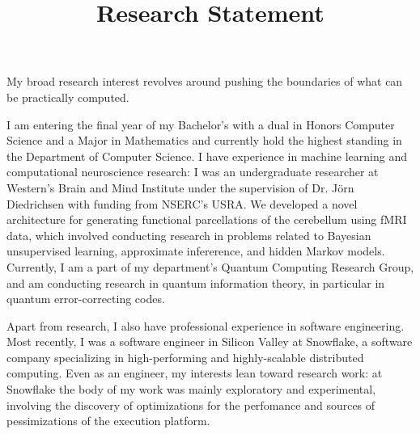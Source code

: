 \documentclass[11pt,a4paper,sans]{moderncv} %
\title{Research Statement}
\begin{document}
\makecvtitle %


\setlength{\parskip}{12pt}


My broad research interest revolves around pushing the boundaries of what can be practically computed.

I am entering the final year of my Bachelor's with a dual in Honors Computer Science and a Major in Mathematics and currently hold the highest standing in the Department of Computer Science. I have experience in machine learning and computational neuroscience research: I was an undergraduate researcher at Western's Brain and Mind Institute under the supervision of Dr. Jörn Diedrichsen with funding from NSERC's USRA. We developed a novel architecture for generating functional parcellations of the cerebellum using fMRI data, which involved conducting research in problems related to Bayesian unsupervised learning, approximate infererence, and hidden Markov models. Currently, I am a part of my department's Quantum Computing Research Group, and am conducting research in quantum information theory, in particular in quantum error-correcting codes.

Apart from research, I also have professional experience in software engineering. Most recently, I was a software engineer in Silicon Valley at Snowflake, a software company specializing in high-performing and highly-scalable distributed computing. Even as an engineer, my interests lean toward research work: at Snowflake the body of my work was mainly exploratory and experimental, involving the discovery of optimizations for the perfomance and sources of pessimizations of the execution platform.
\end{document}
